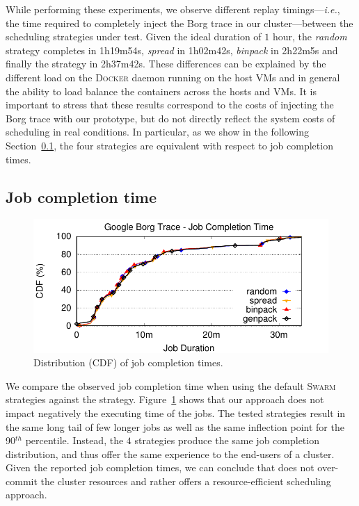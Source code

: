 While performing these experiments, we observe different replay timings---\emph{i.e.}, the time required to completely inject the Borg trace in our cluster---between the scheduling strategies under test.
Given the ideal duration of $1$ hour, the \emph{random} strategy completes in 1h19m54s, \emph{spread} in 1h02m42s, \emph{binpack} in 2h22m5s and finally the \GP strategy in 2h37m42s.
These differences can be explained by the different load on the \textsc{Docker} daemon running on the host VMs and in general the ability to load balance the containers across the hosts and VMs.
It is important to stress that these results correspond to the costs of injecting the Borg trace with our prototype, but do not directly reflect the system costs of scheduling in real conditions.
In particular, as we show in the following Section~\ref{subsec:eval:compl}, the four strategies are equivalent with respect to job completion times.


\subsection{Job completion time}
\label{subsec:eval:compl}

\begin{figure}[t!]
  \centering
  \includegraphics[]{figures/plots/completion/completion}
  \caption{Distribution (CDF) of job completion times.}
  \label{fig:completion}
\end{figure}

We compare the observed job completion time when using the default \textsc{Swarm} strategies against the \GP strategy.
Figure~\ref{fig:completion} shows that our approach does not impact negatively the executing time of the jobs.
The tested strategies result in the same long tail of few longer jobs as well as the same inflection point for the 90$^{th}$ percentile.
Instead, the $4$ strategies produce the same job completion distribution, and thus offer the same experience to the end-users of a \GP cluster.
Given the reported job completion times, we can conclude that \GP does not over-commit the cluster resources and rather offers a resource-efficient scheduling approach.

